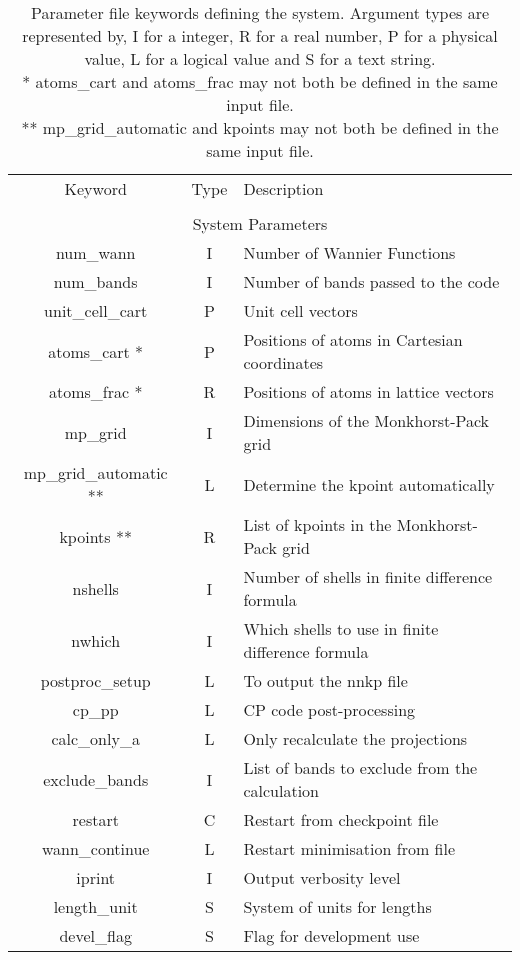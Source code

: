 \begin{table}
\begin{center}
\begin{tabular}{|c|c|p{6cm}|}
\hline
Keyword & Type & Description \\
        &      &             \\
\hline\hline
\multicolumn{3}{|c|}{System Parameters} \\
\hline
{\sc num\_wann }   & I & Number of Wannier Functions \\
{\sc num\_bands }   & I & Number of bands passed to the code \\
{\sc unit\_cell\_cart }   & P & Unit cell vectors \\
{\sc atoms\_cart }*   & P & Positions of atoms in Cartesian coordinates \\
{\sc atoms\_frac }*   & R & Positions of atoms in lattice vectors \\
{\sc mp\_grid }   & I & Dimensions of the Monkhorst-Pack grid \\
{\sc mp\_grid\_automatic }**   & L & Determine the kpoint automatically \\
{\sc kpoints }**   & R & List of kpoints in the Monkhorst-Pack grid \\
{\sc nshells }   & I & Number of shells in finite difference formula \\
{\sc nwhich }   & I & Which shells to use in finite difference formula \\
{\sc postproc\_setup }   & L & To output the nnkp file \\
{\sc cp\_pp }   & L & CP code post-processing \\
{\sc calc\_only\_a }   & L & Only recalculate the projections \\
{\sc exclude\_bands }   & I & List of bands to exclude from the calculation \\
{\sc restart }   & C & Restart from checkpoint file \\
{\sc wann\_continue }   & L & Restart minimisation from file \\
{\sc iprint }   & I & Output verbosity level \\
{\sc length\_unit }   & S & System of units for lengths \\
{\sc devel\_flag }   & S & Flag for development use \\
\hline
\end{tabular}
\caption[Parameter file keywords controlling system parameters.]
{Parameter file keywords defining the system.  Argument types
are represented by, I for a integer, R for a real number, P for a
physical value, L for a logical value and S for a text string.\\
 {\footnotesize
* {\sc atoms\_cart } and  {\sc atoms\_frac } may not both be defined in the same input file.\\
** {\sc mp\_grid\_automatic } and  {\sc kpoints } may not both be defined in the same input file.
}}
\label{parameter_keywords1}
\end{center}
\end{table}



